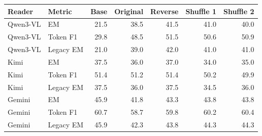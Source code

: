 \begin{tabular}{llrrrrr}
\toprule
Reader & Metric & Base & Original & Reverse & Shuffle 1 & Shuffle 2\\
\midrule
Qwen3-VL & EM & 21.5 & 38.5 & 41.5 & 41.0 & 40.0\\
Qwen3-VL & Token F1 & 29.8 & 48.5 & 51.5 & 50.6 & 50.9\\
Qwen3-VL & Legacy EM & 21.0 & 39.0 & 42.0 & 41.0 & 41.0\\
Kimi & EM & 37.5 & 36.0 & 37.0 & 34.0 & 35.0\\
Kimi & Token F1 & 51.4 & 51.2 & 51.4 & 50.2 & 49.9\\
Kimi & Legacy EM & 37.5 & 36.0 & 37.5 & 34.5 & 36.0\\
Gemini & EM & 45.9 & 41.8 & 43.3 & 43.8 & 43.8\\
Gemini & Token F1 & 60.7 & 58.7 & 59.8 & 60.2 & 60.4\\
Gemini & Legacy EM & 45.9 & 42.3 & 43.8 & 44.3 & 44.3\\
\bottomrule
\end{tabular}
